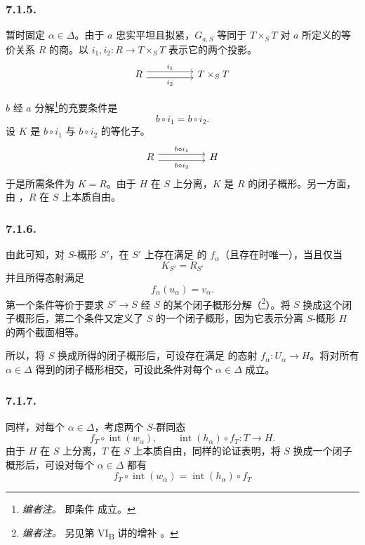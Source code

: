 \subsubsection*{7.1.5.}
暂时固定 \(\alpha\in\Delta\)。由于 \(a\) 忠实平坦且拟紧，\(G_{a,S}\) 等同于 \(T\times_S T\) 对 \(a\) 所定义的等价关系 \(R\) 的商。以 \(i_1,i_2:R\to T\times_S T\) 表示它的两个投影。
\[
\begin{tikzcd}[column sep=huge]
R
  \arrow[r,shift left=.7ex,"i_1"]
  \arrow[r,shift right=.7ex,"i_2"']
&
T\times_S T
\end{tikzcd}
\]

\(b\) 经 \(a\) 分解\footnote{\textit{编者注。} 即条件  成立。}的充要条件是
\[
  b\circ i_1=b\circ i_2.
\]
设 \(K\) 是 \(b\circ i_1\) 与 \(b\circ i_2\) 的等化子。
\[
\begin{tikzcd}[column sep=huge]
R
  \arrow[r,shift left=.7ex,"b\circ i_1"]
  \arrow[r,shift right=.7ex,"b\circ i_2"']
&
H
\end{tikzcd}
\]
于是所需条件为 \(K=R\)。由于 \(H\) 在 \(S\) 上分离，\(K\) 是 \(R\) 的闭子概形。另一方面，由 ，\(R\) 在 \(S\) 上本质自由。

\subsubsection*{7.1.6.}
由此可知，对 \(S\)-概形 \(S'\)，在 \(S'\) 上存在满足  的 \(f_\alpha\)（且存在时唯一），当且仅当
\[
  K_{S'}=R_{S'}
\]
并且所得态射满足
\[
  f_\alpha(u_\alpha)=v_\alpha.
\]
第一个条件等价于要求 \(S'\to S\) 经 \(S\) 的某个闭子概形分解（\footnote{\textit{编者注。} 另见第 VI\textsubscript{B} 讲的增补 。}）。将 \(S\) 换成这个闭子概形后，第二个条件又定义了 \(S\) 的一个闭子概形，因为它表示分离 \(S\)-概形 \(H\) 的两个截面相等。

所以，将 \(S\) 换成所得的闭子概形后，可设存在满足  的态射 \(f_\alpha:U_\alpha\to H\)。将对所有 \(\alpha\in\Delta\) 得到的闭子概形相交，可设此条件对每个 \(\alpha\in\Delta\) 成立。

\subsubsection*{7.1.7.}
同样，对每个 \(\alpha\in\Delta\)，考虑两个 \(S\)-群同态
\[
  f_T\circ\operatorname{int}(w_\alpha),
  \qquad
  \operatorname{int}(h_\alpha)\circ f_T
  :T\longrightarrow H.
\]
由于 \(H\) 在 \(S\) 上分离，\(T\) 在 \(S\) 上本质自由，同样的论证表明，将 \(S\) 换成一个闭子概形后，可设对每个 \(\alpha\in\Delta\) 都有
\[
  f_T\circ\operatorname{int}(w_\alpha)
  =
  \operatorname{int}(h_\alpha)\circ f_T
\]

